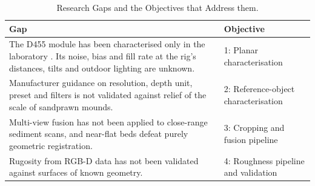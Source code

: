 \begin{table}[htbp]
	\centering
	\caption{Research Gaps and the Objectives that Address them.}
	\label{tab:review.gaps}
	\small
	\begin{tabularx}{\textwidth}{@{}X p{4.2cm}@{}}
		\toprule
		Gap & Objective \\
		\midrule
		The D455 module has been characterised only in the laboratory \citep{serviMetrologicalCharacterizationComparison2021}. Its noise, bias and fill rate at the rig's distances, tilts and outdoor lighting are unknown. & 1: Planar characterisation \\
		Manufacturer guidance on resolution, depth unit, preset and filters is not validated against relief of the scale of sandprawn mounds. & 2: Reference-object characterisation \\
		Multi-view fusion has not been applied to close-range sediment scans, and near-flat beds defeat purely geometric registration. & 3: Cropping and fusion pipeline \\
		Rugosity from RGB-D data has not been validated against surfaces of known geometry. & 4: Roughness pipeline and validation \\
		\bottomrule
	\end{tabularx}
\end{table}
